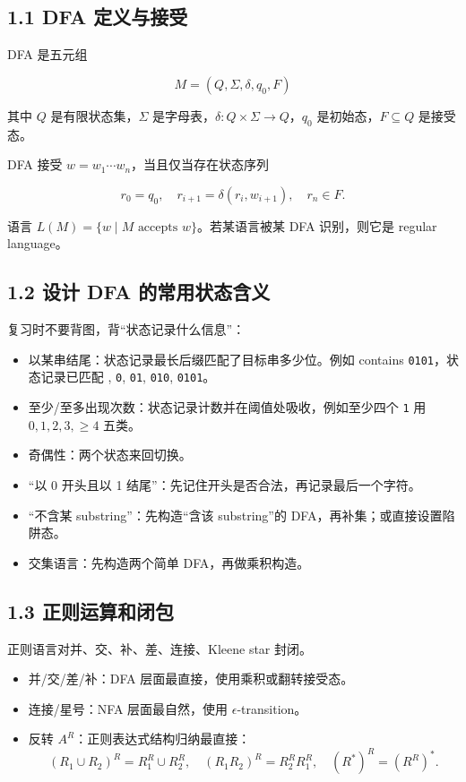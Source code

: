 ﻿\documentclass[UTF8,11pt]{ctexart}
\begin{document}
\subsection{1.1 DFA 定义与接受}


DFA 是五元组

\[
M=(Q,\Sigma,\delta,q_0,F)
\]

其中 \(Q\) 是有限状态集，\(\Sigma\) 是字母表，\(\delta:Q\times\Sigma\to Q\)，\(q_0\) 是初始态，\(F\subseteq Q\) 是接受态。


DFA 接受 \(w=w_1\cdots w_n\)，当且仅当存在状态序列

\[
r_0=q_0,\quad r_{i+1}=\delta(r_i,w_{i+1}),\quad r_n\in F.
\]

语言 \(L(M)=\{w\mid M\text{ accepts }w\}\)。若某语言被某 DFA 识别，则它是 regular language。


\subsection{1.2 设计 DFA 的常用状态含义}


复习时不要背图，背“状态记录什么信息”：


\begin{itemize}
\item 以某串结尾：状态记录最长后缀匹配了目标串多少位。例如 contains \texttt{0101}，状态记录已匹配 \texttt{}, \texttt{0}, \texttt{01}, \texttt{010}, \texttt{0101}。
\item 至少/至多出现次数：状态记录计数并在阈值处吸收，例如至少四个 \texttt{1} 用 \(0,1,2,3,\ge4\) 五类。
\item 奇偶性：两个状态来回切换。
\item “以 0 开头且以 1 结尾”：先记住开头是否合法，再记录最后一个字符。
\item “不含某 substring”：先构造“含该 substring”的 DFA，再补集；或直接设置陷阱态。
\item 交集语言：先构造两个简单 DFA，再做乘积构造。
\end{itemize}


\subsection{1.3 正则运算和闭包}


正则语言对并、交、补、差、连接、Kleene star 封闭。


\begin{itemize}
\item 并/交/差/补：DFA 层面最直接，使用乘积或翻转接受态。
\item 连接/星号：NFA 层面最自然，使用 \(\epsilon\)-transition。
\item 反转 \(A^R\)：正则表达式结构归纳最直接：
\[
  (R_1\cup R_2)^R=R_1^R\cup R_2^R,\quad
  (R_1R_2)^R=R_2^RR_1^R,\quad
  (R^*)^R=(R^R)^*.
  \]

\end{itemize}
\end{document}
